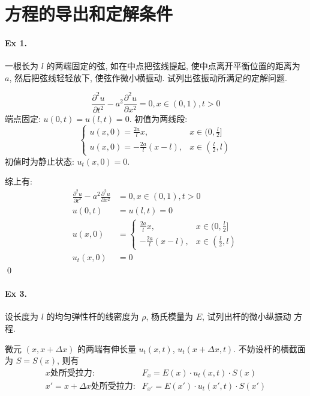 \section{方程的导出和定解条件}
\paragraph{Ex 1.}
一根长为 $l$ 的两端固定的弦, 如在中点把弦线提起, 使中点离开平衡位置的距离为 $a$,
然后把弦线轻轻放下, 使弦作微小横振动. 试列出弦振动所满足的定解问题.

\solution
\[
\frac{\partial^2 u}{\partial t^2} - a^2 \frac{\partial^2 u}{\partial x^2} = 0,
x \in (0, 1), t > 0
\]
端点固定: $u(0, t) = u(l, t) = 0$. 初值为两线段:
\[\begin{cases}
u(x, 0) = \frac{2a}{l} x, & x \in (0, \frac{l}{2}] \\
u(x, 0) = -\frac{2a}{l} (x - l), & x \in (\frac{l}{2}, l)
\end{cases} \]
初值时为静止状态: $u_t(x, 0) = 0$.

综上有:
\[ \begin{aligned}
\frac{\partial^2 u}{\partial t^2} - a^2 \frac{\partial^2 u}{\partial x^2} &= 0,
x \in (0, 1), t > 0\\
u(0, t) &= u(l, t) = 0\\
u(x, 0) &= \begin{cases}
\frac{2a}{l} x, & x \in (0, \frac{l}{2}] \\
-\frac{2a}{l} (x - l), & x \in (\frac{l}{2}, l)
\end{cases}\\
u_t(x, 0) &= 0
\end{aligned} \]
\qed

\paragraph{Ex 3.}
设长度为 $l$ 的均匀弹性杆的线密度为 $\rho$, 杨氏模量为 $E$, 试列出杆的微小纵振动
方程.

\solution 微元 $(x, x + \Delta x)$ 的两端有伸长量 $u_t(x, t)$,
$u_t(x + \Delta x, t)$. 不妨设杆的横截面为 $S = S(x)$, 则有
\[ \begin{aligned}
x\text{处所受拉力:} & F_x = E(x) \cdot u_t(x, t) \cdot S(x) \\
x' = x + \Delta x\text{处所受拉力:} & F_{x'} = E(x') \cdot u_t(x', t)\cdot S(x')
\end{aligned} \]

